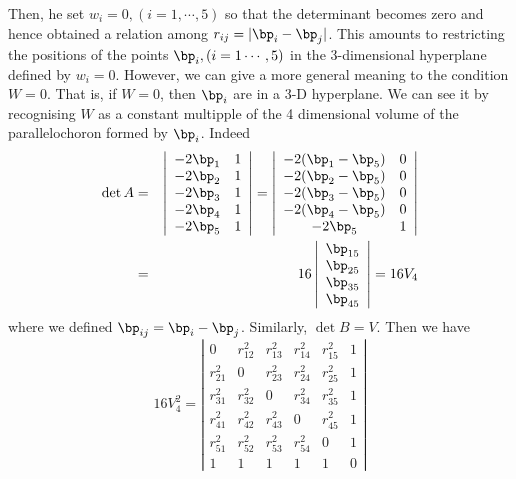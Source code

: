 \documentclass{article}
\begin{document}
Then, he set $w_i=0, (i=1,\cdots,5)$ so that the determinant becomes zero and hence obtained a relation among $r_{ij}=|\bp_{i} - \bp_{j}|$.
 This amounts to restricting the positions of the points $\bp_i, (i=1\cdots,5)$ in the 3-dimensional hyperplane defined by $w_i=0$. However, we can give a more general meaning to the condition $W=0$.
 That is, if $W=0$, then $\bp_i$ are in a 3-D hyperplane. We can see it by recognising $W$ as a constant multipple of the 4 dimensional volume of the parallelochoron formed by $\bp_i$. Indeed
\begin{eqnarray}
\det A & = &  \left|\begin{array}{cc}  -2\bp_1 & 1 \\ -2\bp_2 & 1 \\ -2\bp_3 & 1 \\ -2\bp_4 & 1 \\ -2\bp_5 &  1 \end{array}\right|
=\left|\begin{array}{cc}  -2(\bp_1-\bp_5) & 0 \\ -2(\bp_2-\bp_5) & 0 \\ -2(\bp_3-\bp_5) & 0 \\ -2(\bp_4 -\bp_5) & 0 \\ -2\bp_5 &  1 \\
\end{array}\right| \nonumber\\
 & = & 16\left|\begin{array}{c}  \bp_{15}  \\ \bp_{25} \\ \bp_{35} \\ \bp_{45} 
\end{array}\right| 
=16V_4
\end{eqnarray}
where we defined $\bp_{ij} = \bp_i -\bp_j$. Similarly, $\det B = V$. Then we have
\begin{equation}
\label{eq:vol_det}
16V_4^2 = \left|\begin{array}{cccccc}0 & r_{12}^2 & r_{13}^2 & r_{14}^2 & r_{15}^2 & 1 \\r_{21}^2 & 0 & r_{23}^2 & r_{24}^2 & r_{25}^2 & 1 \\r_{31}^2 & r_{32}^2 & 0 & r_{34}^2 & r_{35}^2 & 1 \\r_{41}^2 & r_{42}^2 & r_{43}^2 & 0 & r_{45}^2 & 1 \\r_{51}^2 & r_{52}^2 & r_{53}^2 & r_{54}^2 & 0 & 1 \\1 & 1 & 1 & 1 & 1 & 0  \end{array}\right|
\end{equation}
\end{document}
